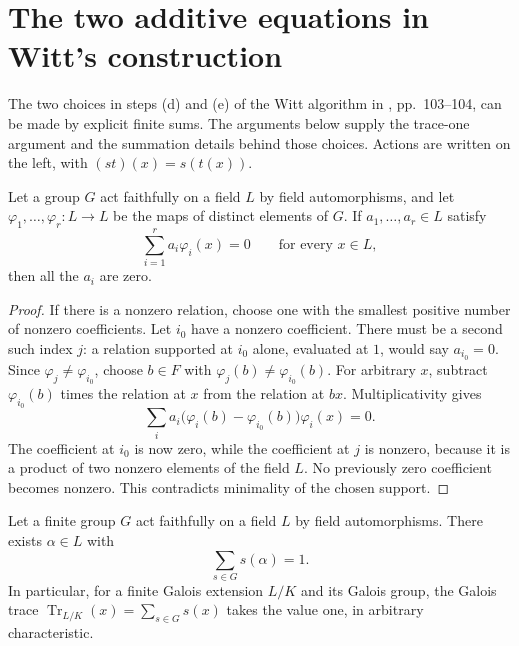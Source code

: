 \section{The two additive equations in Witt's construction}

The two choices in steps (d) and (e) of the Witt algorithm in
\cite{Camina1997}, pp.~103--104, can be made by explicit finite sums.
The arguments below supply the trace-one argument and the summation
details behind those choices. Actions are written on the left, with
$(st)(x)=s(t(x))$.

\begin{lemma}
\label{lem:field-hom-linear-independence}
\leanok
Let a group $G$ act faithfully on a field $L$ by field
automorphisms, and let $\varphi_1,\ldots,\varphi_r:L\to L$
be the maps of distinct elements of $G$.
If $a_1,\ldots,a_r\in L$ satisfy
\[
 \sum_{i=1}^r a_i\varphi_i(x)=0\qquad\text{for every }x\in L,
\]
then all the $a_i$ are zero.
\end{lemma}

\begin{proof}
If there is a nonzero relation, choose one with the smallest
positive number of nonzero coefficients. Let $i_0$ have a nonzero
coefficient. There must be a second such index $j$: a relation
supported at $i_0$ alone, evaluated at $1$, would say $a_{i_0}=0$.
Since $\varphi_j\ne\varphi_{i_0}$, choose $b\in F$ with
$\varphi_j(b)\ne\varphi_{i_0}(b)$.
For arbitrary $x$, subtract $\varphi_{i_0}(b)$ times the relation
at $x$ from the relation at $bx$. Multiplicativity gives
\[
 \sum_i a_i\bigl(\varphi_i(b)-\varphi_{i_0}(b)\bigr)
           \varphi_i(x)=0.
\]
The coefficient at $i_0$ is now zero, while the coefficient at
$j$ is nonzero, because it is a product of two nonzero elements
of the field $L$. No previously zero coefficient becomes nonzero.
This contradicts minimality of the chosen support.
\end{proof}

\begin{lemma}
\label{lem:galois-trace-one}
\leanok
Let a finite group $G$ act faithfully on a field $L$ by field
automorphisms. There exists $\alpha\in L$ with
\[
 \sum_{s\in G}s(\alpha)=1.
\]
In particular, for a finite Galois extension $L/K$ and its Galois group, the Galois trace $\operatorname{Tr}_{L/K}(x)=\sum_{s\in G}s(x)$
takes the value one, in arbitrary characteristic.
\end{lemma}

